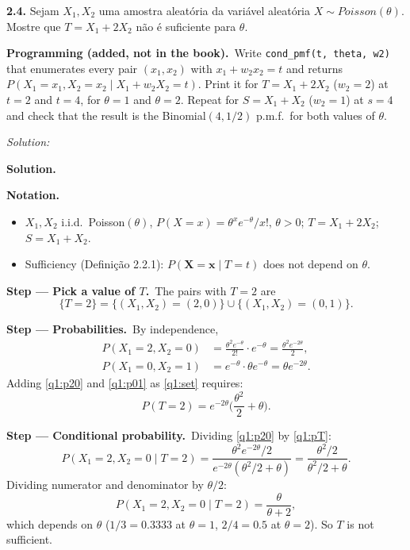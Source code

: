 \documentclass[11pt,a4paper]{article}
\newif\ifsolucoes
\newcommand{\espacoresol}{4.5cm}   %
\numberwithin{equation}{questao}   %
\newcommand{\programacao}{\par\smallskip\noindent\textbf{Programming (added, not in the book).}~}
\newenvironment{notacao}{\par\smallskip\noindent\textbf{Notation.}\begin{itemize}[leftmargin=1.4em,topsep=1pt,itemsep=0pt]\small}{\end{itemize}}
\newcommand{\resolespaco}{\ifsolucoes\else\par\textit{Solution:}\vspace{\espacoresol}\par\fi}
\newcommand{\passo}[2]{\par\smallskip\noindent\textbf{Step --- #1.}~#2}
\newcommand{\solhead}{\par\medskip\noindent{\color{blue!55!black}\rule{\linewidth}{0.3pt}}\par\noindent\textbf{Solution.}}
\newcommand{\1}{\mathbf{1}}
\begin{document}
\begin{otherlanguage}{brazil}
\textbf{2.4.} Sejam $X_1,X_2$ uma amostra aleatória da variável aleatória $X\sim\mathit{Poisson}(\theta)$.
Mostre que $T=X_1+2X_2$ não é suficiente para $\theta$.
\end{otherlanguage}
\programacao Write \texttt{cond\_pmf(t, theta, w2)} that enumerates every pair $(x_1,x_2)$ with
$x_1+w_2x_2=t$ and returns $P(X_1=x_1,X_2=x_2\mid X_1+w_2X_2=t)$. Print it for $T=X_1+2X_2$
($w_2=2$) at $t=2$ and $t=4$, for $\theta=1$ and $\theta=2$. Repeat for $S=X_1+X_2$ ($w_2=1$) at
$s=4$ and check that the result is the Binomial$(4,1/2)$ p.m.f.\ for both values of $\theta$.
\resolespaco
\begin{sol}
\solhead
\begin{notacao}
\item $X_1,X_2$ i.i.d.\ Poisson$(\theta)$, $P(X=x)=\theta^xe^{-\theta}/x!$, $\theta>0$; $T=X_1+2X_2$; $S=X_1+X_2$.
\item Sufficiency (Definição 2.2.1): $P(\mathbf X=\mathbf x\mid T=t)$ does not depend on $\theta$.
\end{notacao}

\passo{Pick a value of $T$}{The pairs with $T=2$ are}
\begin{equation}\label{q1:set}
\{T=2\}=\{(X_1,X_2)=(2,0)\}\cup\{(X_1,X_2)=(0,1)\}.
\end{equation}

\passo{Probabilities}{By independence,}
\begin{align}
P(X_1=2,X_2=0)&=\frac{\theta^2e^{-\theta}}{2!}\cdot e^{-\theta}=\frac{\theta^2e^{-2\theta}}{2}, \label{q1:p20}\\
P(X_1=0,X_2=1)&=e^{-\theta}\cdot\theta e^{-\theta}=\theta e^{-2\theta}. \label{q1:p01}
\end{align}
Adding \eqref{q1:p20} and \eqref{q1:p01} as \eqref{q1:set} requires:
\begin{equation}\label{q1:pT}
P(T=2)=e^{-2\theta}\Big(\frac{\theta^2}{2}+\theta\Big).
\end{equation}

\passo{Conditional probability}{Dividing \eqref{q1:p20} by \eqref{q1:pT}:}
\[
P(X_1=2,X_2=0\mid T=2)=\frac{\theta^2e^{-2\theta}/2}{e^{-2\theta}(\theta^2/2+\theta)}=\frac{\theta^2/2}{\theta^2/2+\theta}.
\]
Dividing numerator and denominator by $\theta/2$:
\begin{equation}\label{q1:cond}
P(X_1=2,X_2=0\mid T=2)=\frac{\theta}{\theta+2},
\end{equation}
which depends on $\theta$ ($1/3=0.3333$ at $\theta=1$, $2/4=0.5$ at $\theta=2$). So $T$ is not
sufficient.


\end{sol}
\end{document}
